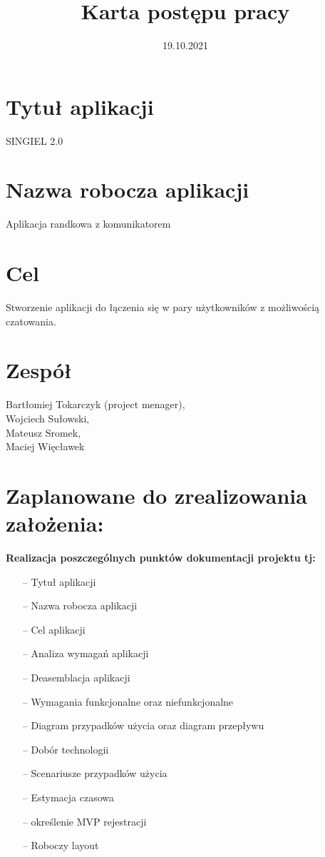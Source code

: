 \documentclass[12pt,a4paper]{article}
\begin{document}
\title{Karta postępu pracy}
\date{19.10.2021}

\maketitle


\section*{Tytuł aplikacji}
SINGIEL 2.0
\section*{Nazwa robocza aplikacji}
Aplikacja randkowa z komunikatorem
\section*{Cel}
Stworzenie aplikacji do łączenia się w pary użytkowników z możliwością czatowania.
\section*{Zespół}
Bartłomiej Tokarczyk  (project menager), \\
Wojciech Sułowski, \\
Mateusz Sromek, \\
Maciej Więcławek \\
\newpage

\section{Zaplanowane do zrealizowania założenia:}
\textbf{Realizacja poszczególnych punktów dokumentacji projektu tj:}
\begin{itemize}
    \item [--] Tytuł aplikacji
    \item [--] Nazwa robocza aplikacji
    \item [--] Cel aplikacji
    \item [--] Analiza wymagań aplikacji
    \item [--] Deasemblacja aplikacji
    \item [--] Wymagania funkcjonalne oraz niefunkcjonalne
    \item [--] Diagram przypadków użycia oraz diagram przepływu
    \item [--] Dobór technologii
    \item [--] Scenariusze przypadków użycia
    \item [--] Estymacja czasowa
    \item [--] określenie MVP rejestracji
    \item [--] Roboczy layout
\end{itemize}
\end{document}
